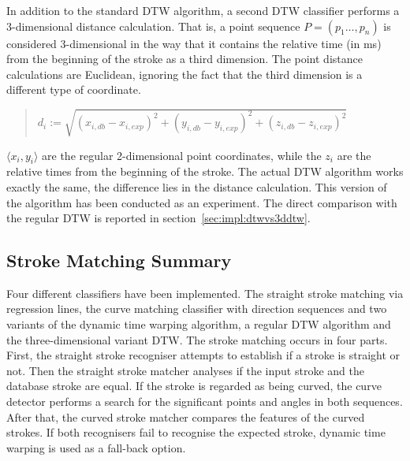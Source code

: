 In addition to the standard DTW algorithm, a second DTW classifier performs 
a 3-dimensional distance calculation.
That is, a point sequence \(P = (p_{1}\ldots,p_{n})\) is considered 
3-dimensional in the way that it contains the relative time (in ms) from the
beginning of the stroke as a third dimension.
The point distance calculations are Euclidean, ignoring the fact that the
third dimension is a different type of coordinate.
\begin{quote}
\(
  d_i := \sqrt{(x_{i,db}-x_{i,exp})^2+(y_{i,db}-y_{i,exp})^2+(z_{i,db}-z_{i,exp})^2} 
\)
\end{quote}
\(\langle x_i, y_i \rangle \) are the regular 2-dimensional point coordinates, 
while the \(z_i\) are the relative times from the beginning of the stroke.
The actual DTW algorithm works exactly the same, the difference lies in 
the distance calculation.
This version of the algorithm has been conducted as an experiment. The direct
comparison with the regular DTW is reported in 
section~\ref{sec:impl:dtwvs3ddtw}.


\subsection{Stroke Matching Summary}
\label{sec:hwre:strokematchingsummary}

Four different classifiers have been implemented.
The straight stroke matching via regression lines,
the curve matching classifier with direction sequences and two variants
of the dynamic time warping algorithm, a regular DTW algorithm and the 
three-dimensional variant DTW.
The stroke matching occurs in four parts. 
First, the straight stroke recogniser attempts to establish if a stroke 
is straight or not. Then the straight stroke matcher analyses if the input
stroke and the database stroke are equal.
If the stroke is regarded as being curved, the curve detector 
performs a search for the significant points and angles in both sequences.
After that, the curved stroke matcher compares the features of the curved
strokes. If both recognisers fail to recognise the expected stroke, 
dynamic time warping is used as a fall-back option.

